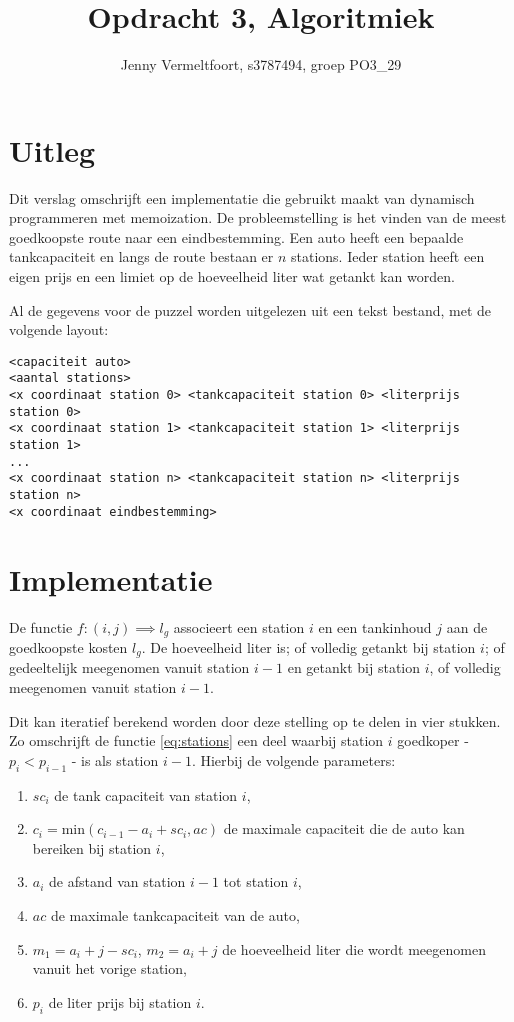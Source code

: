 \documentclass[10pt,tikz]{article}
\title{Opdracht 3, Algoritmiek}
\author{Jenny Vermeltfoort, s3787494, groep PO3\_29}
\begin{document}
\def\tablename{Tabel}

\maketitle

\section*{Uitleg}
Dit verslag omschrijft een implementatie die gebruikt maakt van dynamisch programmeren met memoization.
De probleemstelling is het vinden van de meest goedkoopste route naar een eindbestemming.
Een auto heeft een bepaalde tankcapaciteit en langs de route bestaan er $n$ stations.
Ieder station heeft een eigen prijs en een limiet op de hoeveelheid liter wat getankt kan worden.

Al de gegevens voor de puzzel worden uitgelezen uit een tekst bestand, met de volgende layout:
\begin{lstlisting}
<capaciteit auto>
<aantal stations>
<x coordinaat station 0> <tankcapaciteit station 0> <literprijs station 0>
<x coordinaat station 1> <tankcapaciteit station 1> <literprijs station 1>
...
<x coordinaat station n> <tankcapaciteit station n> <literprijs station n>
<x coordinaat eindbestemming>
\end{lstlisting}


\section*{Implementatie}

De functie $f: (i,j) \implies l_g$ associeert een station $i$ en een tankinhoud $j$ aan de goedkoopste kosten $l_g$.
De hoeveelheid liter is; of volledig getankt bij station $i$; of gedeeltelijk meegenomen vanuit station $i-1$ en getankt bij station $i$, of volledig meegenomen vanuit station $i-1$.

Dit kan iteratief berekend worden door deze stelling op te delen in vier stukken.
Zo omschrijft de functie \ref{eq:stations} een deel waarbij station $i$ goedkoper - $p_i < p_{i-1}$ - is als station $i-1$.
Hierbij de volgende parameters:
\begin{enumerate}[label=\roman*.]
	\item $sc_i$ de tank capaciteit van station $i$,
	\item $c_i = \text{min}(c_{i-1} - a_i + sc_i, ac)$ de maximale capaciteit die de auto kan bereiken bij station $i$,
	\item $a_i$ de afstand van station $i-1$ tot station $i$,
	\item $ac$ de maximale tankcapaciteit van de auto,
	\item $m_1 = a_i + j - sc_i$, $m_2 = a_i + j$ de hoeveelheid liter die wordt meegenomen vanuit het vorige station,
	\item $p_i$ de liter prijs bij station $i$.
\end{enumerate}
\end{document}
